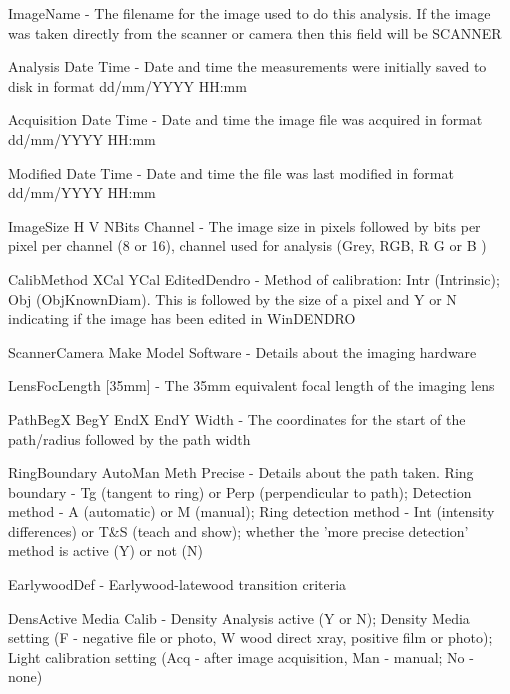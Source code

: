 \begin{itemize*}
 \item ImageName - The filename for the image used to do this analysis. If the image was taken directly from the scanner or camera then this field will be SCANNER
\item 

Analysis Date Time - Date and time the measurements were initially saved to disk in format dd/mm/YYYY HH:mm
\item 

Acquisition Date Time - Date and time the image file was acquired in format dd/mm/YYYY HH:mm
\item 

Modified Date Time - Date and time the file was last modified in format dd/mm/YYYY HH:mm
\item 

ImageSize H V NBits Channel - The image size in pixels followed by bits per pixel per channel (8 or 16), channel used for analysis (Grey, RGB, R G or B )
\item 

CalibMethod XCal YCal EditedDendro - Method of calibration: Intr (Intrinsic); Obj (ObjKnownDiam). This is followed by the size of a pixel and Y or N indicating if the image has been edited in WinDENDRO
\item 

ScannerCamera Make Model Software - Details about the imaging hardware
\item 

LensFocLength [35mm] - The 35mm equivalent focal length of the imaging lens
\item 

PathBegX BegY EndX EndY Width - The coordinates for the start of the path/radius followed by the path width
\item 

RingBoundary AutoMan Meth Precise - Details about the path taken. Ring boundary - Tg (tangent to ring) or Perp (perpendicular to path); Detection method - A (automatic) or M (manual); Ring detection method - Int (intensity differences) or T\&S (teach and show); whether the 'more precise detection' method is active (Y) or not (N)
\item 

EarlywoodDef - Earlywood-latewood transition criteria
\item 

DensActive Media Calib - Density Analysis active (Y or N); Density Media setting (F - negative file or photo, W wood direct xray, positive film or photo); Light calibration setting (Acq - after image acquisition, Man - manual; No - none)
\item 


\end{itemize*}

